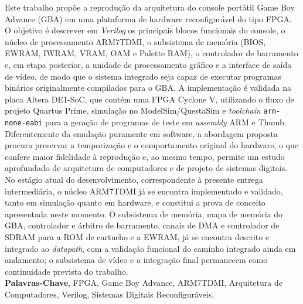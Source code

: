 \documentclass[pnumromarab,times]{politex}
\begin{document}
\capa
\falsafolhaderosto
\folhaderosto








\begin{resumo}
Este trabalho propõe a reprodução da arquitetura do console portátil
Game Boy Advance (GBA) em uma plataforma de hardware reconfigurável
do tipo FPGA. O objetivo é descrever em \emph{Verilog} os principais
blocos funcionais do console, o núcleo de processamento ARM7TDMI,
o subsistema de memória (BIOS, EWRAM, IWRAM, VRAM, OAM e Palette RAM),
o controlador de barramento e, em etapa posterior, a unidade de
processamento gráfico e a interface de saída de vídeo, de modo que
o sistema integrado seja capaz de executar programas binários
originalmente compilados para o GBA. A implementação é validada na
placa Altera DE1-SoC, que contém uma FPGA Cyclone V, utilizando o
fluxo de projeto Quartus Prime, simulação no ModelSim/QuestaSim e
\textit{toolchain} \texttt{arm-none-eabi} para a geração de programas
de teste em \emph{assembly} ARM e Thumb. Diferentemente da emulação
puramente em software, a abordagem proposta procura preservar a
temporização e o comportamento original do hardware, o que confere
maior fidelidade à reprodução e, ao mesmo tempo, permite um estudo
aprofundado de arquitetura de computadores e de projeto de sistemas
digitais. No estágio atual do desenvolvimento, correspondente à
presente entrega intermediária, o núcleo ARM7TDMI já se encontra
implementado e validado, tanto em simulação quanto em hardware, e
constitui a prova de conceito apresentada neste momento. O subsistema
de memória, mapa de memória do GBA, controlador e árbitro de
barramento, canais de DMA e controlador de SDRAM para a ROM de
cartucho e a EWRAM, já se encontra descrito e integrado ao \textit{datapath},
com a validação funcional do caminho integrado ainda em andamento; o
subsistema de vídeo e a integração final permanecem como continuidade
prevista do trabalho.
%
\\[3\baselineskip]
%
\textbf{Palavras-Chave}, FPGA, Game Boy Advance, ARM7TDMI,
Arquitetura de Computadores, Verilog, Sistemas Digitais Reconfiguráveis.
\end{resumo}
\end{document}

